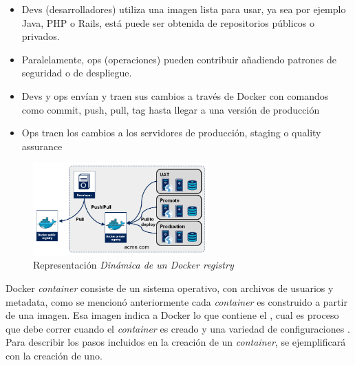 \documentclass[letter,10pt]{article}
\begin{document}
	\begin{itemize}
		\item Devs (desarrolladores) utiliza una imagen lista para usar, ya sea por ejemplo Java, PHP o Rails, está puede ser obtenida de repositorios públicos o privados.
		\item Paralelamente, ops (operaciones) pueden contribuir añadiendo patrones de seguridad o de despliegue.
		\item Devs y ops envían y traen sus cambios a través de Docker con comandos como commit, push, pull, tag hasta llegar a una versión de producción
		\item Ops traen los cambios a los servidores de producción, staging o quality assurance
	\end{itemize}
	
\begin{figure}[H]
  \centering
  \includegraphics[width=0.6\textwidth]{images/registry-dynamic.png}
    \caption{Representación \textit{Dinámica de un \textit{Docker registry} }}
    \label{fig:dynamic}
\end{figure}	
	
Docker \textit{container} consiste de  un sistema operativo, con archivos de usuarios y metadata, como se mencionó anteriormente cada \textit{container} es construido a partir de una imagen. Esa imagen indica a Docker lo que contiene el \container, cual es proceso que debe correr cuando el  \textit{container} es creado y una variedad de configuraciones \cite{Docker:2015:understanding}. Para describir los pasos incluidos en la creación de un \emph{container}, se ejemplificará con la creación de uno.
\end{document}
